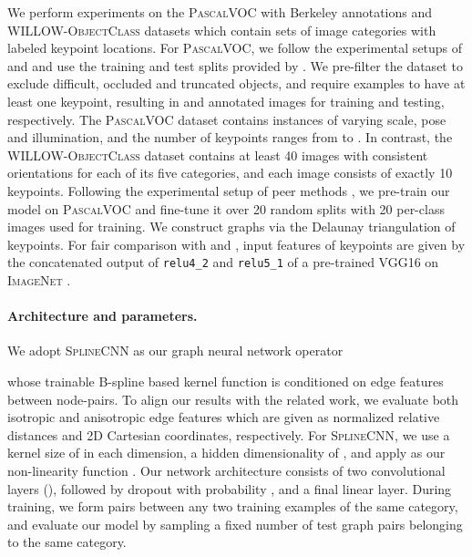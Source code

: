 \documentclass{article}
\begin{document}
We perform experiments on the \textsc{PascalVOC} \citep{Everingham/etal/2010} with Berkeley annotations \citep{Bourdev/etal/2009} and \textsc{WILLOW-ObjectClass} \citep{Cho/etal/2013} datasets which contain sets of image categories with labeled keypoint locations.
For \textsc{PascalVOC}, we follow the experimental setups of \citet{Zanfir/Sminchisescu/2018} and \citet{Wang/etal/2019} and use the training and test splits provided by \citet{Choy/etal/2016}.
We pre-filter the dataset to exclude difficult, occluded and truncated objects, and require examples to have at least one keypoint, resulting in  and  annotated images for training and testing, respectively.
The \textsc{PascalVOC} dataset contains instances of varying scale, pose and illumination, and the number of keypoints ranges from  to .
In contrast, the \textsc{WILLOW-ObjectClass} dataset contains at least 40 images with consistent orientations for each of its five categories, and each image consists of exactly 10 keypoints.
Following the experimental setup of peer methods \citep{Cho/etal/2013,Wang/etal/2019}, we pre-train our model on \textsc{PascalVOC} and fine-tune it over 20 random splits with 20 per-class images used for training.
We construct graphs via the Delaunay triangulation of keypoints.
For fair comparison with \citet{Zanfir/Sminchisescu/2018} and \citet{Wang/etal/2019}, input features of keypoints are given by the concatenated output of \texttt{relu4\_2} and \texttt{relu5\_1} of a pre-trained \textsc{VGG16} \citep{Simonyan/Zisserman/2014} on \textsc{ImageNet} \citep{Deng/etal/2009}.

\paragraph{Architecture and parameters.}

We adopt \textsc{SplineCNN} \citep{Fey/etal/2018} as our graph neural network operator

whose trainable B-spline based kernel function  is conditioned on edge features  between node-pairs.
To align our results with the related work, we evaluate both isotropic and anisotropic edge features which are given as normalized relative distances and 2D Cartesian coordinates, respectively.
For \textsc{SplineCNN}, we use a kernel size of  in each dimension, a hidden dimensionality of , and apply  as our non-linearity function .
Our network architecture consists of two convolutional layers (), followed by dropout with probability , and a final linear layer.
During training, we form pairs between any two training examples of the same category, and evaluate our model by sampling a fixed number of test graph pairs belonging to the same category.
\end{document}
